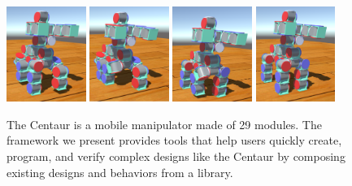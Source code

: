 \documentclass[graybox]{svmult}
\begin{document}
\begin{figure}
\begin{center}
                \includegraphics[width=0.23\textwidth]{images/library/unity/step1.png}
                \includegraphics[width=0.23\textwidth]{images/library/unity/step2.png}
                \includegraphics[width=0.23\textwidth]{images/library/unity/step3.png}
                \includegraphics[width=0.23\textwidth]{images/library/unity/step4.png}
\end{center}
\caption{The Centaur is a  mobile manipulator made of 29 modules. The framework
we present provides tools that help users quickly create, program, and verify complex designs
like the Centaur by composing existing designs and behaviors from a library.  }
\label{fig:walk}
\end{figure}
\end{document}
